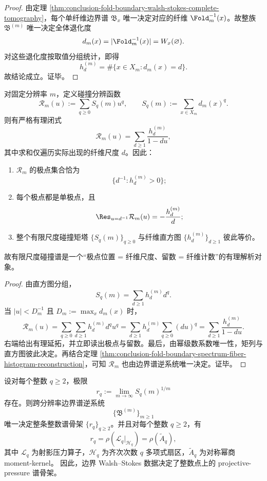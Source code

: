 \begin{proof}
由定理 \ref{thm:conclusion-fold-boundary-walsh-stokes-complete-tomography}，每个单纤维边界谱 \(\mathfrak B_x\) 唯一决定对应的纤维 \(\Fold_m^{-1}(x)\)。故整族 \(\mathfrak B^{(m)}\) 唯一决定全体退化度
\[
d_m(x)=|\Fold_m^{-1}(x)|=W_x(\varnothing).
\]
对这些退化度按取值分组统计，即得
\[
h_d^{(m)}=\#\{x\in X_m:d_m(x)=d\}.
\]
故结论成立。证毕。
\end{proof}

\begin{theorem}[碰撞分辨函数的有限极点]\label{thm:conclusion-fold-collision-resolvent-finite-pole}
对固定分辨率 \(m\)，定义碰撞分辨函数
\[
\mathcal R_m(u):=\sum_{q\ge 0}S_q(m)u^q,
\qquad
S_q(m):=\sum_{x\in X_m} d_m(x)^q.
\]
则有严格有理闭式
\[
\mathcal R_m(u)=\sum_{d\ge 1}\frac{h_d^{(m)}}{1-du},
\]
其中求和仅遍历实际出现的纤维尺度 \(d\)。因此：
\begin{enumerate}
  \item \(\mathcal R_m\) 的极点集合恰为
  \[
  \{d^{-1}:h_d^{(m)}>0\};
  \]
  \item 每个极点都是单极点，且
  \[
  \Res_{u=d^{-1}}\mathcal R_m(u)=-\frac{h_d^{(m)}}{d};
  \]
  \item 整个有限尺度碰撞矩塔 \(\{S_q(m)\}_{q\ge 0}\) 与纤维直方图 \(\{h_d^{(m)}\}_{d\ge 1}\) 彼此等价。
\end{enumerate}
故有限尺度碰撞谱是一个“极点位置 = 纤维尺度、留数 = 纤维计数”的有理解析对象。
\end{theorem}

\begin{proof}
由直方图分组，
\[
S_q(m)=\sum_{d\ge 1}h_d^{(m)}d^q.
\]
当 \(|u|<D_m^{-1}\) 且 \(D_m:=\max_x d_m(x)\) 时，
\[
\mathcal R_m(u)
=\sum_{q\ge 0}\sum_{d\ge 1}h_d^{(m)}d^q u^q
=\sum_{d\ge 1}h_d^{(m)}\sum_{q\ge 0}(du)^q
=\sum_{d\ge 1}\frac{h_d^{(m)}}{1-du}.
\]
右端给出有理延拓，并立即读出极点与留数。最后，由幂级数系数唯一性，矩列与直方图彼此决定。再结合定理 \ref{thm:conclusion-fold-boundary-spectrum-fiber-histogram-reconstruction}，可知 \(\mathcal R_m\) 也由边界谱逆系统唯一决定。证毕。
\end{proof}

\begin{theorem}[边界数据决定整数射影压力骨架]\label{thm:conclusion-fold-boundary-determines-integer-projective-pressure-skeleton}
设对每个整数 \(q\ge 2\)，极限
\[
r_q:=\lim_{m\to\infty} S_q(m)^{1/m}
\]
存在。则跨分辨率边界谱逆系统
\[
\{\mathfrak B^{(m)}\}_{m\ge 1}
\]
唯一决定整条整数谱骨架 \(\{r_q\}_{q\ge 2}\)。并且对每个整数 \(q\ge 2\)，有
\[
r_q=\rho(\mathcal L_q\vert_{\mathcal H_q})=\rho(\widetilde A_q),
\]
其中 \(\mathcal L_q\) 为射影压力算子，\(\mathcal H_q\) 为齐次次数 \(q\) 多项式扇区，\(\widetilde A_q\) 为对称幂商 moment-kernel。
因此，边界 Walsh--Stokes 数据决定了整数点上的 projective-pressure 谱骨架。
\end{theorem}

